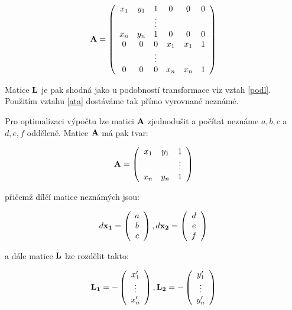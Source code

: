 \begin{eqnarray}\label{afineA}
{\bf A}=
\left(
\begin{array}{cccccc}
x_{1} & y_{1} & 1  &  0    & 0      & 0 \\
    &       & \vdots  &       &     &   \\
x_{n} & y_{n} & 1  &  0    & 0      & 0 \\
   0  & 0     & 0  & x_{1} &  x_{1} & 1 \\
      &       & \vdots  &       &   &   \\
   0  & 0     & 0  & x_{n} &  x_{n} & 1
\end{array}
\right)
\end{eqnarray}

Matice ${\bf L}$ je pak shodná jako u podobností transformace viz vztah
\ref{podl}. Použitím vztahu \ref{ata} dostáváme tak přímo vyrovnané
neznámé.

Pro optimalizaci výpočtu lze matici ${\bf A}$ zjednodušit a počítat neznáme
$a,b,c$ a $d,e,f$ odděleně. Matice ${\bf A}$  má pak tvar:

$$
{\bf A}=
\left(
\begin{array}{cccccc}
x_{1} & y_{1} & 1   \\
    &       & \vdots    \\
x_{n} & y_{n} & 1   \\
\end{array}
\right)
$$

přičemž dílčí matice neznámých jsou:

$$ d{\bf x_1} =
\left(
\begin{array}{c}
a\\
b\\
c
\end{array}
\right), 
d{\bf x_2} =
\left(
\begin{array}{c}
d\\
e\\
f
\end{array}
\right) $$ 

a dále matice ${\bf L}$ lze rozdělit takto:

\begin{eqnarray}
{\bf L_1} = -\left(
\begin{array}{c}
x'_{1}\\
\vdots \\
x'_{n}\\
\end{array}
\right), 
{\bf L_2} = -\left(
\begin{array}{c}
y'_{1}\\ 
\vdots \\
y'_{n}
\end{array}
\right) 
\end{eqnarray}


